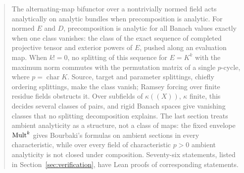 \begin{abstract}
The alternating-map bifunctor over a nontrivially normed field acts analytically on analytic bundles when
precomposition is analytic. For normed $E$ and $D$, precomposition is analytic for all Banach values exactly
when one class vanishes: the class of the exact sequence of completed projective tensor and exterior powers of $E$,
pushed along an evaluation map. When $k!=0$, no splitting of this sequence for $E=K^k$ with the maximum norm commutes with
the permutation matrix of a single $p$-cycle, where $p=\operatorname{char}K$. Source, target
and parameter splittings, chiefly ordering splittings, make the class vanish; Ramsey forcing over finite residue fields
obstructs it. Over subfields of $\kappa((X))$, $\kappa$ finite, this decides several classes of pairs, and rigid Banach
spaces give vanishing classes that no splitting decomposition explains. The last section treats ambient analyticity as a
structure, not a class of maps: the fixed envelope $\Mult^k$ gives Bourbaki's formulas on ambient sections in every
characteristic, while over every field of characteristic $p>0$ ambient analyticity is not closed under composition. Seventy-six statements, listed in
Section~\ref{sec:verification}, have Lean proofs of corresponding statements.
\end{abstract}
\maketitle
\setcounter{tocdepth}{1}
\begingroup
\small
\linespacing=8pt
\tableofcontents\removelastskip
\endgroup
\clearpage
